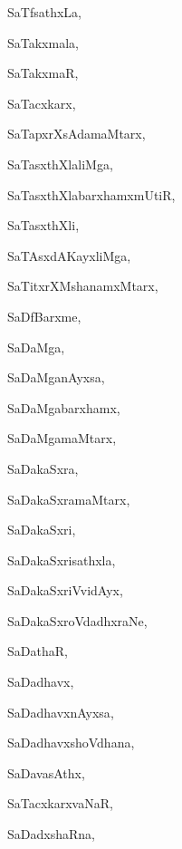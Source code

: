 \begin{multicols}{3}
{\noindent
{SaTfsathxLa}, \pageref{SaTfsathxLa}

\noindent
{SaTakxmala}, \pageref{SaTakxmala}

\noindent
{SaTakxmaR}, \pageref{SaTakxmaR}

\noindent
{SaTacxkarx}, \pageref{SaTacxkarx}

\noindent
{SaTapxrXsAdamaMtarx}, \pageref{SaTapxrXsAdamaMtarx}

\noindent
{SaTasxthXlaliMga}, \pageref{SaTasxthXlaliMga}

\noindent
{SaTasxthXlabarxhamxmUtiR}, \pageref{SaTasxthXlabarxhamxmUtiR}

\noindent
{SaTasxthXli}, \pageref{SaTasxthXli}

\noindent
{SaTAsxdAKayxliMga}, \pageref{SaTAsxdAKayxliMga}

\noindent
{SaTitxrXMshanamxMtarx}, \pageref{SaTitxrXMshanamxMtarx}

\noindent
{SaDfBarxme}, \pageref{SaDfBarxme}

\noindent
{SaDaMga}, \pageref{SaDaMga}

\noindent
{SaDaMganAyxsa}, \pageref{SaDaMganAyxsa}

\noindent
{SaDaMgabarxhamx}, \pageref{SaDaMgabarxhamx}

\noindent
{SaDaMgamaMtarx}, \pageref{SaDaMgamaMtarx}

\noindent
{SaDakaSxra}, \pageref{SaDakaSxra}

\noindent
{SaDakaSxramaMtarx}, \pageref{SaDakaSxramaMtarx}

\noindent
{SaDakaSxri}, \pageref{SaDakaSxri}

\noindent
{SaDakaSxrisathxla}, \pageref{SaDakaSxrisathxla}

\noindent
{SaDakaSxriVvidAyx}, \pageref{SaDakaSxriVvidAyx}

\noindent
{SaDakaSxroVdadhxraNe}, \pageref{SaDakaSxroVdadhxraNe}

\noindent
{SaDathaR}, \pageref{SaDathaR}

\noindent
{SaDadhavx}, \pageref{SaDadhavx}

\noindent
{SaDadhavxnAyxsa}, \pageref{SaDadhavxnAyxsa}

\noindent
{SaDadhavxshoVdhana}, \pageref{SaDadhavxshoVdhana}

\noindent
{SaDavasAthx}, \pageref{SaDavasAthx}

\noindent
{SaTacxkarxvaNaR}, \pageref{SaTacxkarxvaNaR}

\noindent
{SaDadxshaRna}, \pageref{SaDadxshaRna}

}
\end{multicols}
